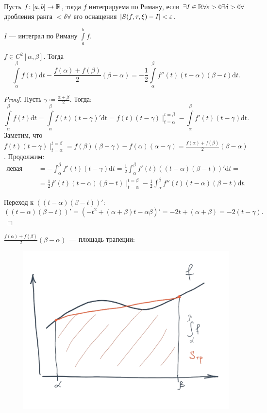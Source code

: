 \begin{definition}
    Пусть $f\!: [a, b] \to \mathbb{R}$, тогда $f$  интегрируема по Риману, если $\exists I \in \mathbb{R} \forall \varepsilon > 0 \exists \delta > 0 \forall$ дробления ранга  $< \delta \forall$ его оснащения  $|S(f, \tau, \xi) - I| < \varepsilon$. 

     $I$ --- интеграл по Риману  $\int\limits_a^b f$.
\end{definition}
\begin{lemma}
    $f \in C^2[\alpha, \beta]$. Тогда  \[\int\limits_\alpha^\beta f(t)\mathrm{d}t - \frac{f(\alpha) + f(\beta)}{2}(\beta - \alpha) = -\frac{1}{2} \int\limits_\alpha^\beta f''(t)(t-\alpha)(\beta-t)\mathrm{d}t.\]
\end{lemma}
\begin{proof}
    Пусть  $\gamma \coloneqq \frac{\alpha + \beta}{2}$. Тогда: \[
        \int\limits_\alpha^\beta f(t) \mathrm{d}t = \int\limits_\alpha^\beta f(t)(t-\gamma)' \mathrm{dt} = f(t)(t-\gamma)\mid_{t=\alpha}^{t=\beta} - \int\limits_\alpha^\beta f'(t)(t-\gamma)\mathrm{dt}
    .\] 
    Заметим, что $f(t)(t-\gamma)\mid_{t=\alpha}^{t=\beta} = f(\beta)(\beta - \gamma) - f(\alpha)(\alpha - \gamma) = \frac{f(\alpha) + f(\beta)}{2}(\beta - \alpha)$. Продолжим: \begin{align*}
        \text{левая часть} &= -\int_{\alpha}^\beta f'(t)(t-\gamma)\mathrm{d}t = \frac{1}{2}\int_\alpha^\beta f'(t)((t-\alpha)(\beta-t))' \mathrm{d}t = \\ &= \frac{1}{2}f'(t)(t-\alpha)(\beta - t)\mid_{t=\alpha}^{t=\beta} - \frac{1}{2} \int_\alpha^\beta f''(t)(t-\alpha)(\beta-t)\mathrm{d}t
    .\end{align*}

    Переход к $((t-\alpha)(\beta - t))'$: \[
        ((t-\alpha)(\beta - t))' = (-t^2 + (\alpha + \beta)t - \alpha\beta)' = -2t+(\alpha + \beta) = -2(t-\gamma)
    .\] 
\end{proof}
\begin{remark}
    $\frac{f(\alpha) + f(\beta)}{2}(\beta - \alpha)$~--- площадь трапеции:
    \begin{figure}[h!]
    	\includegraphics[scale=0.16]{riemann_trapezoid}
    \end{figure}
\end{remark}

